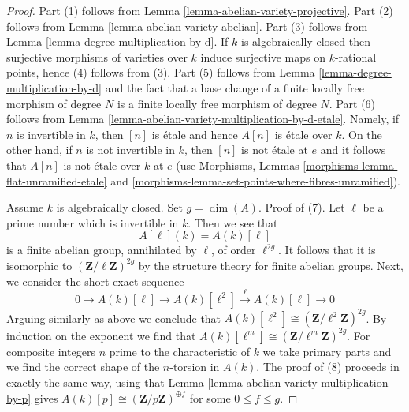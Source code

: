 \begin{proof}
Part (1) follows from Lemma \ref{lemma-abelian-variety-projective}.
Part (2) follows from Lemma \ref{lemma-abelian-variety-abelian}.
Part (3) follows from Lemma \ref{lemma-degree-multiplication-by-d}.
If $k$ is algebraically closed then surjective morphisms of varieties
over $k$ induce surjective maps on $k$-rational points, hence
(4) follows from (3).
Part (5) follows from Lemma \ref{lemma-degree-multiplication-by-d}
and the fact that a base change of a finite locally free morphism
of degree $N$ is a finite locally free morphism of degree $N$.
Part (6) follows from 
Lemma \ref{lemma-abelian-variety-multiplication-by-d-etale}.
Namely, if $n$ is invertible in $k$, then $[n]$ is \'etale
and hence $A[n]$ is \'etale over $k$.
On the other hand, if $n$ is not invertible in $k$, then
$[n]$ is not \'etale at $e$ and it follows that $A[n]$
is not \'etale over $k$ at $e$ (use
Morphisms, Lemmas \ref{morphisms-lemma-flat-unramified-etale} and
\ref{morphisms-lemma-set-points-where-fibres-unramified}).

\medskip\noindent
Assume $k$ is algebraically closed. Set $g = \dim(A)$. Proof of (7).
Let $\ell$ be a prime number which is invertible in $k$. Then we see that
$$
A[\ell](k) = A(k)[\ell]
$$
is a finite abelian group, annihilated by $\ell$, of order $\ell^{2g}$.
It follows that it is isomorphic to $(\mathbf{Z}/\ell\mathbf{Z})^{2g}$
by the structure theory for finite abelian groups. Next, we consider
the short exact sequence
$$
0 \to A(k)[\ell] \to A(k)[\ell^2] \xrightarrow{\ell} A(k)[\ell] \to 0
$$
Arguing similarly as above we conclude that 
$A(k)[\ell^2] \cong (\mathbf{Z}/\ell^2\mathbf{Z})^{2g}$.
By induction on the exponent we find that
$A(k)[\ell^m] \cong (\mathbf{Z}/\ell^m\mathbf{Z})^{2g}$.
For composite integers $n$ prime to the characteristic of $k$
we take primary parts and we find the correct shape of the
$n$-torsion in $A(k)$.
The proof of (8) proceeds in exactly the same way, using that
Lemma \ref{lemma-abelian-variety-multiplication-by-p} gives
$A(k)[p] \cong (\mathbf{Z}/p\mathbf{Z})^{\oplus f}$ for some $0 \leq f \leq g$.
\end{proof}


